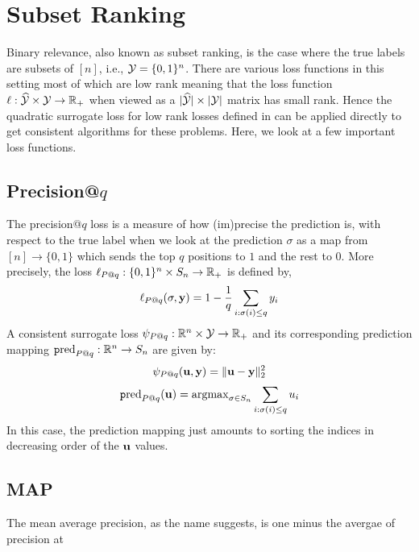 \section{Subset Ranking}\label{sec:binary-relevance}
Binary relevance, also known as subset ranking, is the case where the true labels are subsets of $[n]$, i.e., ${\mathcal Y} = \{0,1\}^n$. There are various loss functions in this setting most of which are low rank meaning that the loss function $\ell:\widehat{\mathcal{Y}} \times {\mathcal Y} \to {\mathbb R}_+$ when viewed as a $|\widehat{\mathcal{Y}}|\times|{\mathcal Y}|$ matrix has small rank. Hence the quadratic surrogate loss for low rank losses defined in \cite{ramaswamy2013convex} can be applied directly to get consistent algorithms for these problems. Here, we look at a few important loss functions.

\subsection{Precision@$q$}
The precision@$q$ loss is a measure of how (im)precise the prediction is, with respect to the true label when we look at the prediction $\sigma$ as a map from $[n] \to \{0,1\}$ which sends the top $q$ positions to $1$ and the rest to $0$. More precisely, the loss $\ell_{P@q}: \{0,1\}^n \times S_n\to {\mathbb R}_+$ is defined by,
$$\ell_{P@q}(\sigma,{\mathbf y}) = 1 - \frac{1}{q}\sum_{i:\sigma(i)\leq q}y_i$$
A consistent surrogate loss $\psi_{P@q}:{\mathbb R}^n \times {\mathcal Y} \to {\mathbb R}_+$ and its corresponding prediction mapping $\text{\texttt pred}_{P@q}:{\mathbb R}^n \to S_n$ are given by:
$$\psi_{P@q}({\mathbf u},{\mathbf y}) = \lVert {\mathbf u} - {\mathbf y} \rVert_2^2$$
$$\text{\texttt pred}_{P@q}({\mathbf u}) = \textup{\textrm{argmax}}_{\sigma\in S_n}\sum_{i:\sigma(i)\leq q}u_i$$
In this case, the prediction mapping just amounts to sorting the indices in decreasing order of the ${\mathbf u}$ values. 

\subsection{MAP}
The mean average precision, as the name suggests, is one minus the avergae of precision at 